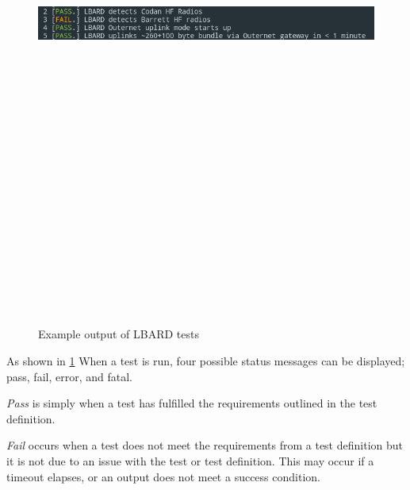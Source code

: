 \begin{figure}
    \begin{centering}
        \includegraphics[width=14cm,height=20cm,keepaspectratio]{Figures/testOutput1.png}
        \caption{Example output of LBARD tests}
        \label{fig:exampleTest}
    \end{centering}
\end{figure}


As shown in \figurename{\ref{fig:exampleTest}} When a test is run, four possible status messages can be displayed; pass, fail, error, and fatal.

\emph{Pass} is simply when a test has fulfilled the requirements outlined in the test definition.

\emph{Fail} occurs when a test does not meet the requirements from a test definition but it is not due to an issue with the test or test definition. This may occur if a timeout elapses, or an output does not meet a success condition.

